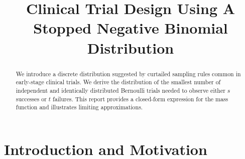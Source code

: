 \documentclass[12pt]{article}
\begin{document}

\title{Clinical Trial Design Using A Stopped Negative Binomial Distribution}
\maketitle






\begin{abstract}
We introduce a discrete distribution suggested by curtailed
sampling rules common in early-stage clinical trials. We derive the
distribution of the smallest number of independent and identically
distributed Bernoulli trials needed to observe either $s$ successes 
or $t$ failures. This report provides a closed-form expression for the 
mass function and illustrates limiting approximations.
\end{abstract}




\section{Introduction and Motivation}
\end{document}
